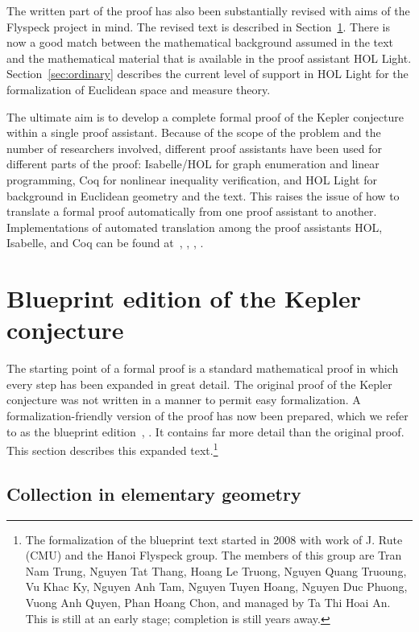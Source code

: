 \documentclass[11pt]{amsart}
\begin{document}
The written part of the proof has also been substantially revised with aims of the Flyspeck project in mind.  The revised text is described in Section~\ref{sec:blueprint}.  There is now a good match between the mathematical background assumed in the text and the mathematical material that is available in the proof assistant HOL Light.  Section~\ref{sec:ordinary} describes the current level of support in HOL Light for the formalization of Euclidean space and measure theory.

The ultimate aim is to develop a complete formal proof of the Kepler
conjecture within a single proof assistant.  Because of the scope of 
the problem and the number of researchers involved, different proof
assistants have been used for different parts of the proof:
Isabelle/HOL for graph enumeration and linear programming, Coq for
nonlinear inequality verification, and HOL Light for background
in Euclidean geometry and the text.  This raises the issue of how
to translate a formal proof automatically from one proof assistant to another.
Implementations of automated translation among the
proof assistants HOL, Isabelle, and Coq can be found 
at~\cite{obua:import}, \cite{McLaughlin:2006:IJCAR}, \cite{wiedijk:encoding},
\cite{695027}.



\section{Blueprint edition of the Kepler conjecture}
\label{sec:blueprint}

The starting point of a formal proof is a standard mathematical proof in which every step
has been expanded in great detail.  The original proof of the Kepler conjecture was not written
in a manner to permit easy formalization.  A formalization-friendly version of the proof has
now been prepared, which we refer to as the blueprint edition~\cite{hales:2008:blueprint}, \cite{hales:2008:collection}.  It contains far more detail than the original proof.  This section 
describes this expanded text.\footnote{The formalization of the blueprint text started in
2008 with work of J. Rute (CMU) and the Hanoi Flyspeck group. The members of this group are Tran Nam Trung, Nguyen Tat Thang, Hoang Le Truong, Nguyen Quang Truoung, Vu Khac Ky, Nguyen Anh Tam, Nguyen Tuyen Hoang, Nguyen Duc Phuong, Vuong Anh Quyen, Phan Hoang Chon, and managed by Ta Thi Hoai An.  This is still at an early stage; completion is still years away.}

\subsection*{Collection in elementary geometry}
\end{document}
